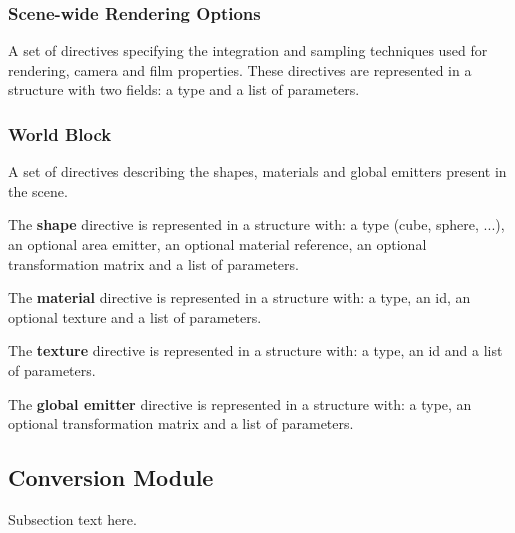 \subsubsection{Scene-wide Rendering Options}
A set of directives specifying the integration and sampling techniques used for 
rendering, camera and film properties. These directives are represented in a 
structure with two fields: a type and a list of parameters.

\subsubsection{World Block}
A set of directives describing the shapes, materials and global emitters present 
in the scene. 

The \textbf{shape} directive is represented in a structure with: a type (cube, 
sphere, ...), an optional area emitter, an optional material reference, an 
optional transformation matrix and a list of parameters. 

The \textbf{material} directive is represented in a structure with: a type, an 
id, an optional texture and a list of parameters.

The \textbf{texture} directive is represented in a structure with: a type, an id 
and a list of parameters.

The \textbf{global emitter} directive is represented in a structure with: a 
type, an optional transformation matrix and a list of parameters.

\subsection{Conversion Module}
Subsection text here.